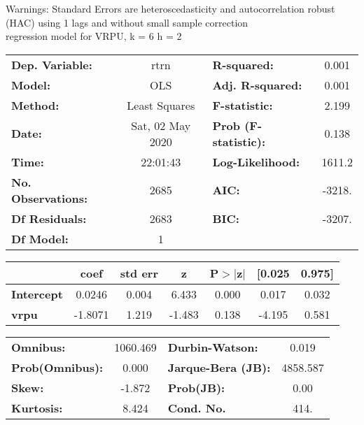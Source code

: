 Warnings: \newline
 [1] Standard Errors are heteroscedasticity and autocorrelation robust (HAC) using 1 lags and without small sample correction\\ 

regression model for VRPU, k = 6 h = 2\begin{center}
\begin{tabular}{lclc}
\toprule
\textbf{Dep. Variable:}    &       rtrn       & \textbf{  R-squared:         } &     0.001   \\
\textbf{Model:}            &       OLS        & \textbf{  Adj. R-squared:    } &     0.001   \\
\textbf{Method:}           &  Least Squares   & \textbf{  F-statistic:       } &     2.199   \\
\textbf{Date:}             & Sat, 02 May 2020 & \textbf{  Prob (F-statistic):} &    0.138    \\
\textbf{Time:}             &     22:01:43     & \textbf{  Log-Likelihood:    } &    1611.2   \\
\textbf{No. Observations:} &        2685      & \textbf{  AIC:               } &    -3218.   \\
\textbf{Df Residuals:}     &        2683      & \textbf{  BIC:               } &    -3207.   \\
\textbf{Df Model:}         &           1      & \textbf{                     } &             \\
\bottomrule
\end{tabular}
\begin{tabular}{lcccccc}
                   & \textbf{coef} & \textbf{std err} & \textbf{z} & \textbf{P$> |$z$|$} & \textbf{[0.025} & \textbf{0.975]}  \\
\midrule
\textbf{Intercept} &       0.0246  &        0.004     &     6.433  &         0.000        &        0.017    &        0.032     \\
\textbf{vrpu}      &      -1.8071  &        1.219     &    -1.483  &         0.138        &       -4.195    &        0.581     \\
\bottomrule
\end{tabular}
\begin{tabular}{lclc}
\textbf{Omnibus:}       & 1060.469 & \textbf{  Durbin-Watson:     } &    0.019  \\
\textbf{Prob(Omnibus):} &   0.000  & \textbf{  Jarque-Bera (JB):  } & 4858.587  \\
\textbf{Skew:}          &  -1.872  & \textbf{  Prob(JB):          } &     0.00  \\
\textbf{Kurtosis:}      &   8.424  & \textbf{  Cond. No.          } &     414.  \\
\bottomrule
\end{tabular}
\end{center}

